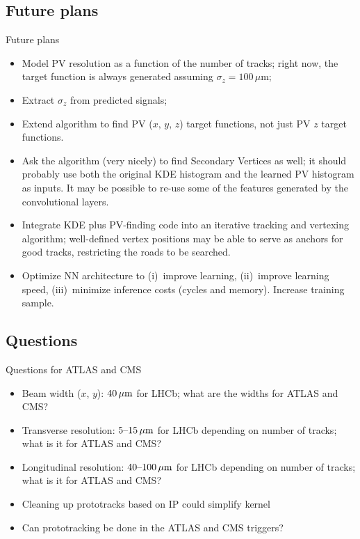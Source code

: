 \subsection{Future plans}
\begin{frame}{Future plans}
    \begin{itemize}
        \item
          Model PV resolution as a function of the number of tracks; right now, the target
          function is always generated assuming $ \sigma_z = 100 \, \mu $m;
        \item
          Extract $ \sigma_z $ from predicted signals;
        \item
          Extend algorithm to find PV ($ x, \, y, \, z $) target functions,
          not just PV $ z $ target functions.
        \item
          Ask the algorithm (very nicely) to find Secondary Vertices as well;
          it should probably use both the original KDE histogram and the
          learned PV histogram as inputs.
          It may be possible to re-use some of the features generated by the
          convolutional layers.
        \item
          Integrate  KDE plus PV-finding code into an iterative tracking and vertexing
          algorithm; well-defined vertex positions may be able to serve as anchors for
          good tracks, restricting the roads to be searched.
        \item
          Optimize NN architecture to (i)~improve learning, (ii)~improve learning speed,
          (iii)~minimize inference costs (cycles and memory).
          Increase training sample.
    \end{itemize}
\end{frame}

\subsection{Questions}
\begin{frame}{Questions for ATLAS and CMS}
    \begin{itemize}
      \item
          Beam width ($x$, $y$): $\unit[40]{\mu m}$ for LHCb; what are the widths for ATLAS and CMS?
      \item
          Transverse resolution: $\unit[5\textup{--}15]{\mu m}$ for LHCb depending on number of tracks; what is it for ATLAS and CMS?
      \item
          Longitudinal resolution: $\unit[40\textup{--}100]{\mu m}$ for LHCb depending on number of tracks; what is it for ATLAS and CMS?
      \item
          Cleaning up prototracks based on IP could simplify kernel
      \item
          Can prototracking be done in the ATLAS and CMS triggers?
    \end{itemize}
\end{frame}
